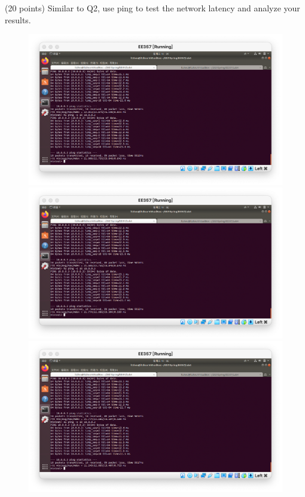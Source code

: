 \begin{exercise}[]{(20 points) Similar to Q2, use ping to test the network latency and analyze your results.}
\begin{solution}
    \begin{figure}[ht]
        \begin{center}
        \begin{minipage}[t]{0.45\linewidth}
            \centering
            \includegraphics[width=\linewidth]{img/lab4/ex3-2.png}
        \end{minipage}
        \begin{minipage}[t]{0.45\linewidth}
            \centering
            \includegraphics[width=\linewidth]{img/lab4/ex3-3.png}
        \end{minipage}
        \begin{minipage}[t]{0.45\linewidth}
            \centering
            \includegraphics[width=\linewidth]{img/lab4/ex3-4.png}

\end{minipage}
\end{center}
\end{figure}
\end{solution}
\end{exercise}
